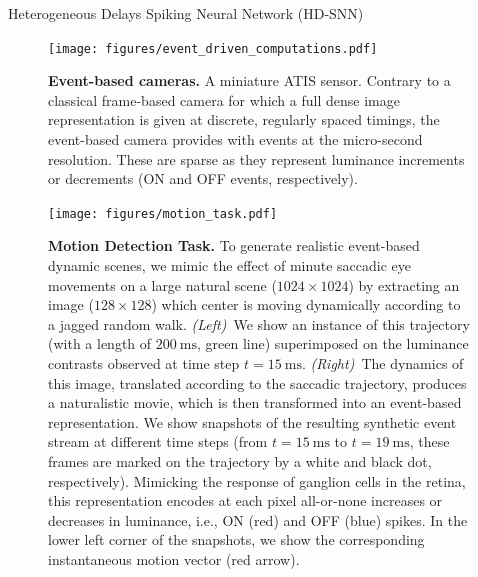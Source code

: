 \documentclass[final]{beamer}
\newcommand{\ms}{\mathrm{ms}}%
\newlength{\colwidth}
\begin{document}
\begin{frame}[t]
\begin{columns}[t]
\begin{column}{\colwidth}
\begin{block}{Heterogeneous Delays Spiking Neural Network (HD-SNN)~\parencite{Grimaldi23BC}}
\begin{figure}%
	{ \centering
	\texttt{[image: figures/event\_driven\_computations.pdf]}
	\caption{ \justifying  %
	\textbf{ Event-based cameras.}
	A miniature ATIS sensor. Contrary to a classical frame-based camera for which a full dense image representation is given at discrete, regularly spaced timings, the event-based camera provides with events at the micro-second resolution. These are sparse as they represent luminance increments or decrements (ON and OFF events, respectively).
	}
	\label{fig:silicon_retina}
		}
\end{figure}
\begin{figure}%
    \centering
    \texttt{[image: figures/motion\_task.pdf]}
    \caption{ \justifying 
       \textbf{ Motion Detection Task.} To generate realistic event-based dynamic scenes, we mimic the effect of minute saccadic eye movements on a large natural scene ($1024\times1024$) by extracting an image ($128\times128$) which center is moving dynamically according to a jagged random walk. \textit{(Left)}~We show an instance of this trajectory (with a length of $200~\ms$, green line) superimposed on the luminance contrasts observed at time step $t=15~\ms$. \textit{(Right)}~The dynamics of this image, translated according to the saccadic trajectory, produces a naturalistic movie, which is then transformed into an event-based representation. We show snapshots of the resulting synthetic event stream at different time steps (from $t=15~\ms$ to $t=19~\ms$, these frames are marked on the trajectory by a white and black dot, respectively).
         Mimicking the response of ganglion cells in the retina, this representation encodes at each pixel all-or-none increases or decreases in luminance, i.e., ON (red) and OFF (blue) spikes. In the lower left corner of the snapshots, we show the corresponding instantaneous motion vector (red arrow). %
        }
    \label{fig:motion_task}
\end{figure}


\end{block}
\end{column}
\end{columns}
\end{frame}
\end{document}

